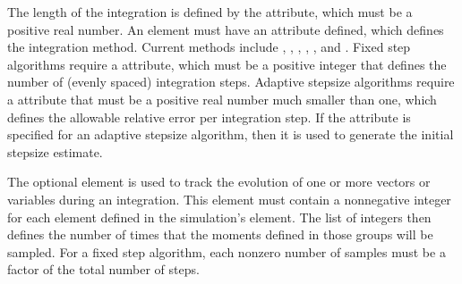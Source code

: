 \documentclass[letterpaper,10pt,english]{sphinxmanual}
\begin{document}
\ignorespaces 
\sphinxAtStartPar
The length of the integration is defined by the  attribute, which must be a positive real number.  An  element must have an  attribute defined, which defines the integration method.  Current methods include {\hyperref[\detokenize{reference_elements:si}]{}}, {\hyperref[\detokenize{reference_elements:si}]{}}, {\hyperref[\detokenize{reference_elements:rk4}]{}}, {\hyperref[\detokenize{reference_elements:rk4}]{}}, {\hyperref[\detokenize{reference_elements:ark45}]{}}, and {\hyperref[\detokenize{reference_elements:ark45}]{}}.  Fixed step algorithms require a  attribute, which must be a positive integer that defines the number of (evenly spaced) integration steps.  Adaptive stepsize algorithms require a  attribute that must be a positive real number much smaller than one, which defines the allowable relative error per integration step.  If the  attribute is specified for an adaptive stepsize algorithm, then it is used to generate the initial stepsize estimate.

\ignorespaces {}\label{\detokenize{reference_elements:sampleselement}}
\sphinxAtStartPar
The optional  element is used to track the evolution of one or more vectors or variables during an integration.  This element must contain a non\sphinxhyphen{}negative integer for each {\hyperref[\detokenize{reference_elements:samplinggroupelement}]{}} element defined in the simulation’s {\hyperref[\detokenize{reference_elements:outputelement}]{}} element.  The list of integers then defines the number of times that the moments defined in those groups will be sampled.  For a fixed step algorithm, each non\sphinxhyphen{}zero number of samples must be a factor of the total number of steps.
\end{document}
